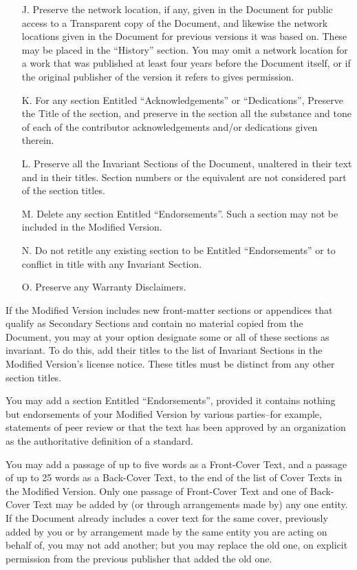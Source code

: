 \documentclass[a4paper,spanish,12pt]{book}
\begin{document}
\begin{itemize}
\item[J.]
   Preserve the network location, if any, given in the Document for
   public access to a Transparent copy of the Document, and likewise
   the network locations given in the Document for previous versions
   it was based on.  These may be placed in the ``History'' section.
   You may omit a network location for a work that was published at
   least four years before the Document itself, or if the original
   publisher of the version it refers to gives permission.
   
\item[K.]
   For any section Entitled ``Acknowledgements'' or ``Dedications'',
   Preserve the Title of the section, and preserve in the section all
   the substance and tone of each of the contributor acknowledgements
   and/or dedications given therein.
   
\item[L.]
   Preserve all the Invariant Sections of the Document,
   unaltered in their text and in their titles.  Section numbers
   or the equivalent are not considered part of the section titles.
   
\item[M.]
   Delete any section Entitled ``Endorsements''.  Such a section
   may not be included in the Modified Version.
   
\item[N.]
   Do not retitle any existing section to be Entitled ``Endorsements''
   or to conflict in title with any Invariant Section.
   
\item[O.]
   Preserve any Warranty Disclaimers.
\end{itemize}

If the Modified Version includes new front-matter sections or
appendices that qualify as Secondary Sections and contain no material
copied from the Document, you may at your option designate some or all
of these sections as invariant.  To do this, add their titles to the
list of Invariant Sections in the Modified Version's license notice.
These titles must be distinct from any other section titles.

You may add a section Entitled ``Endorsements'', provided it contains
nothing but endorsements of your Modified Version by various
parties--for example, statements of peer review or that the text has
been approved by an organization as the authoritative definition of a
standard.

You may add a passage of up to five words as a Front-Cover Text, and a
passage of up to 25 words as a Back-Cover Text, to the end of the list
of Cover Texts in the Modified Version.  Only one passage of
Front-Cover Text and one of Back-Cover Text may be added by (or
through arrangements made by) any one entity.  If the Document already
includes a cover text for the same cover, previously added by you or
by arrangement made by the same entity you are acting on behalf of,
you may not add another; but you may replace the old one, on explicit
permission from the previous publisher that added the old one.
\end{document}

